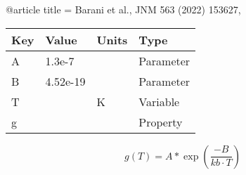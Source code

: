 @article{
title = {Barani et al., JNM 563 (2022) 153627},
}

\begin{tabular}{|l|l|l|l|}
    \hline
    Key & Value & Units & Type \\
    \hline
    A & 1.3e-7 &  & Parameter\\
    B & 4.52e-19  &  & Parameter \\
    T &   & K    & Variable\\
    g &   &  & Property\\
    \hline
\end{tabular}

\begin{equation}
g(T)=A*\exp(\frac{-B}{kb \cdot T})
\end{equation}

